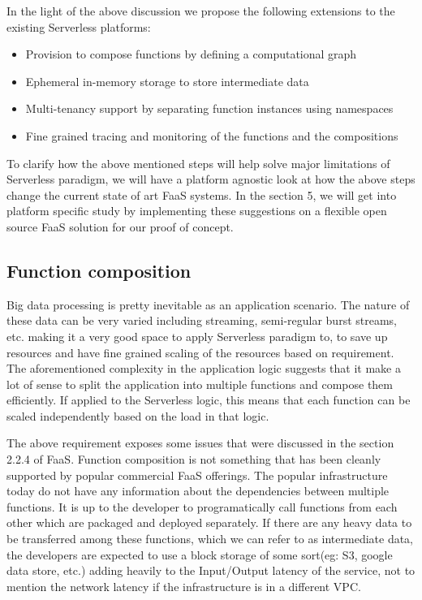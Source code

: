 \documentclass[12pt,titlepage]{article}
\begin{document}
In the light of the above discussion we propose the following extensions to the
existing Serverless platforms:
\begin{itemize}
\item Provision to compose functions by defining a computational graph
\item Ephemeral in-memory storage to store intermediate data
\item Multi-tenancy support by separating function instances using namespaces
\item Fine grained tracing and monitoring of the functions and the compositions
\end{itemize}

To clarify how the above mentioned steps will help solve major limitations of
Serverless paradigm, we will have a platform agnostic look at how the above
steps change the current state of art FaaS systems. In the section 5, we will
get into platform specific study by implementing these suggestions on a flexible
open source FaaS solution for our proof of concept.

\subsection{Function composition}
\label{sec:org04c9ce5}

Big data processing is pretty inevitable as an application scenario. The nature of these
data can be very varied including streaming, semi-regular burst streams, etc.
making it a very good space to apply Serverless paradigm to, to save up
resources and have fine grained scaling of the resources based on requirement.
The aforementioned complexity in the application logic suggests that it make a
lot of sense to split the application into multiple functions and compose them
efficiently. If applied to the Serverless logic, this means that each function
can be scaled independently based on the load in that logic.

The above requirement exposes some issues that were discussed in the section
2.2.4 of FaaS. Function composition is not something that has been cleanly
supported by popular commercial FaaS offerings. The popular infrastructure today
do not have any information about the dependencies between multiple functions.
It is up to the developer to programatically call functions from each other
which are packaged and deployed separately. If there are any heavy data to be
transferred among these functions, which we can refer to as intermediate
data, the developers are expected to use a block storage of some sort(eg: S3,
google data store, etc.) adding heavily to the Input/Output latency of the
service, not to mention the network latency if the infrastructure is in a
different VPC.
\end{document}

